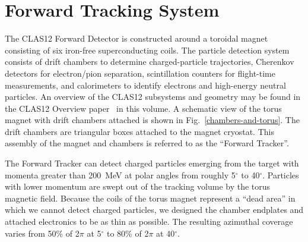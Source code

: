 \section{Forward Tracking System}
\label{overview}

The CLAS12 Forward Detector is constructed around a toroidal magnet consisting of six 
iron-free superconducting coils.  The particle detection system consists of drift 
chambers to determine charged-particle trajectories, Cherenkov detectors 
for electron/pion separation, scintillation counters for flight-time 
measurements, and calorimeters to identify electrons and high-energy neutral 
particles.  An overview of the CLAS12 subsystems and geometry may be found in the 
CLAS12 Overview paper~\cite{clas12-nim} in this volume.  A schematic view of the 
torus magnet with drift chambers
attached is shown in Fig.~\ref{chambers-and-torus}.   The drift chambers are 
triangular boxes attached to the magnet cryostat.  
This assembly of the magnet and chambers is referred to as the ``Forward Tracker''. 

The Forward Tracker can detect charged particles emerging from the target with
momenta greater than 200~MeV at polar angles from roughly 5$^{\circ}$ to 
40$^{\circ}$.  Particles with lower momentum are swept out of the tracking
volume by the torus magnetic field.  
Because the coils of the torus magnet represent a ``dead area''
in which we cannot detect charged particles, we designed the chamber endplates
and attached electronics to be as thin as possible.  The resulting azimuthal
coverage varies from 50\% of 2$\pi$ at 5$^{\circ}$ to 80\% of 2$\pi$ at 40$^{\circ}$.

